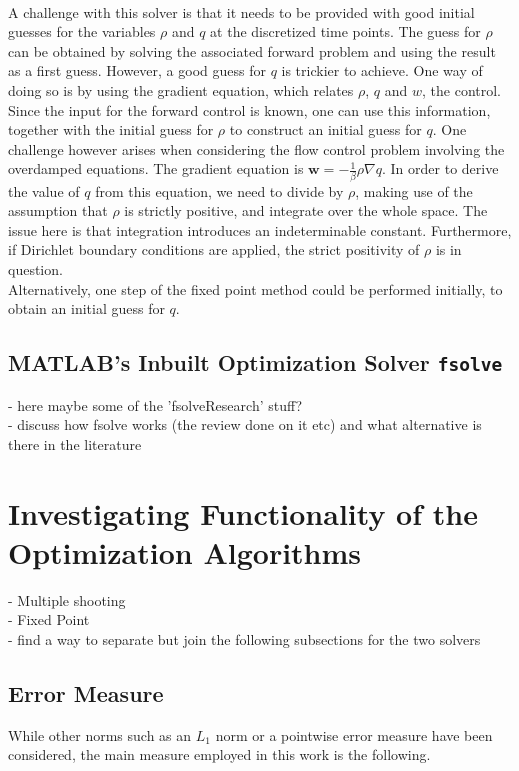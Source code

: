 \documentclass[11pt, a4paper]{article}
\theoremstyle{definition}
\newcommand{\adj}{q}
\begin{document}
\\
A challenge with this solver is that it needs to be provided with good initial guesses for the variables $\rho$ and $\adj$ at the discretized time points. The guess for $\rho$ can be obtained by solving the associated forward problem and using the result as a first guess. However, a good guess for $\adj$ is trickier to achieve. One way of doing so is by using the gradient equation, which relates $\rho$, $\adj$ and $w$, the control. Since the input for the forward control is known, one can use this information, together with the initial guess for $\rho$ to construct an initial guess for $\adj$. 
One challenge however arises when considering the flow control problem involving the overdamped equations. The gradient equation is $\mathbf{w} = - \frac{1}{\beta} \rho\nabla \adj$. In order to derive the value of $\adj$ from this equation, we need to divide by $\rho$, making use of the assumption that $\rho$ is strictly positive, and integrate over the whole space. The issue here is that integration introduces an indeterminable constant. Furthermore, if Dirichlet boundary conditions are applied, the strict positivity of $\rho$ is in question.\\
Alternatively, one step of the fixed point method could be performed initially, to obtain an initial guess for $\adj$. 


\subsection{{\scshape MATLAB}'s Inbuilt Optimization Solver \texttt{fsolve}}
- here maybe some of the 'fsolveResearch' stuff?\\
- discuss how fsolve works (the review done on it etc) and what alternative is there in the literature\\

\section{Investigating Functionality of the Optimization Algorithms}
- Multiple shooting\\
- Fixed Point\\
- find a way to separate but join the following subsections for the two solvers\\
\subsection{Error Measure}\label{sec:ErrorMeasure}
While other norms such as an $L_1$ norm or a pointwise error measure have been considered, the main measure employed in this work is the following.
\end{document}
